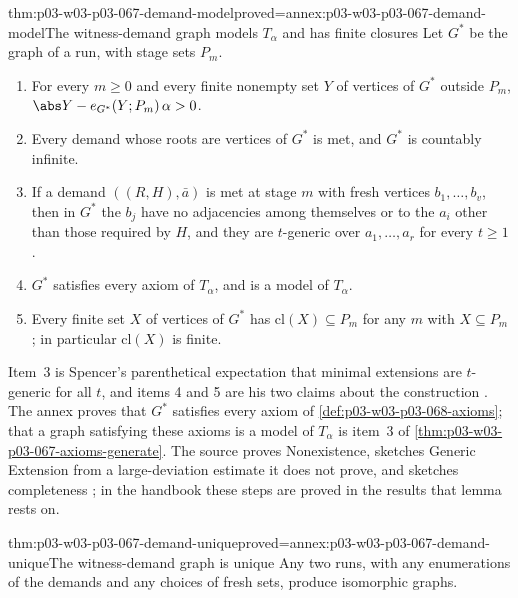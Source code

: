 \begin{hbtheorem}{thm:p03-w03-p03-067-demand-model}{proved=annex:p03-w03-p03-067-demand-model}{The witness-demand graph models \(T_\alpha\) and has finite closures}
Let \(G^\ast\) be the graph of a run, with stage sets \(P_m\).
\begin{enumerate}
\item For every \(m\geq0\) and every finite nonempty set \(Y\) of vertices
  of \(G^\ast\) outside \(P_m\), \(\abs Y-e_{G^\ast}(Y;P_m)\,\alpha>0\).
\item Every demand whose roots are vertices of \(G^\ast\) is met, and
  \(G^\ast\) is countably infinite.
\item If a demand \(((R,H),\bar a)\) is met at stage \(m\) with fresh
  vertices \(b_1,\ldots,b_v\), then in \(G^\ast\) the \(b_j\) have no
  adjacencies among themselves or to the \(a_i\) other than those required
  by \(H\), and they are \(t\)-generic over \(a_1,\ldots,a_r\) for every
  \(t\geq1\).
\item \(G^\ast\) satisfies every axiom of \(T_\alpha\), and is a model of
  \(T_\alpha\).
\item Every finite set \(X\) of vertices of \(G^\ast\) has
  \(\mathrm{cl}(X)\subseteq P_m\) for any \(m\) with \(X\subseteq P_m\); in
  particular \(\mathrm{cl}(X)\) is finite.
\end{enumerate}
\end{hbtheorem}

Item~3 is Spencer's parenthetical expectation that minimal extensions are
\(t\)-generic for all \(t\), and items 4 and 5 are his two claims about the
construction \cite[pp.~14--15]{Spencer2007LogicRandomStructuresAuthor}.
The annex proves that \(G^\ast\) satisfies every axiom of
\cref{def:p03-w03-p03-068-axioms}; that a graph satisfying these axioms is a
model of \(T_\alpha\) is item~3 of
\cref{thm:p03-w03-p03-067-axioms-generate}.  The source proves
Nonexistence, sketches Generic Extension from a large-deviation estimate it
does not prove, and sketches completeness
\cite[pp.~10--12]{Spencer2007LogicRandomStructuresAuthor}; in the handbook
these steps are proved in the results that lemma rests on.

\begin{hbtheorem}{thm:p03-w03-p03-067-demand-unique}{proved=annex:p03-w03-p03-067-demand-unique}{The witness-demand graph is unique}
Any two runs, with any enumerations of the demands and any choices of fresh
sets, produce isomorphic graphs.
\end{hbtheorem}

